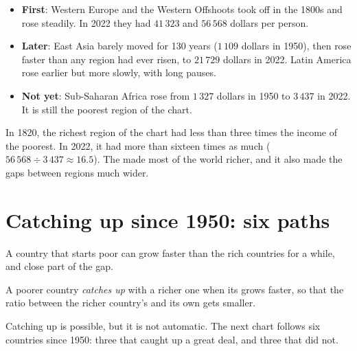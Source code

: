 \begin{itemize}
  \item \textbf{First}: Western Europe and the Western Offshoots took off in the
        1800s and rose steadily. In 2022 they had $41\,323$ and $56\,568$ dollars
        per person.
  \item \textbf{Later}: East Asia barely moved for 130 years ($1\,109$ dollars
        in 1950), then rose faster than any region had ever risen, to $21\,729$
        dollars in 2022. Latin America rose earlier but more slowly, with long
        pauses.
  \item \textbf{Not yet}: Sub-Saharan Africa rose from $1\,327$ dollars in 1950 to
        $3\,437$ in 2022. It is still the poorest region of the chart.
\end{itemize}

In 1820, the richest region of the chart had less than three times the income of
the poorest. In 2022, it had more than sixteen times as much ($56\,568 \div
3\,437 \approx 16.5$). The  made most of the world richer, and it also
made the gaps between regions much wider.

\section{Catching up since 1950: six paths}

A country that starts poor can grow faster than the rich countries for a
while, and close part of the gap.

\begin{definition}[Catch-up]\label{def:g6:living-standards:catch-up}
A poorer country \emph{catches up} with a richer one when its
 grows faster, so that the ratio between the richer country's
 and its own gets smaller.
\end{definition}

Catching up is possible, but it is not automatic. The next chart follows six
countries since 1950: three that caught up a great deal, and three that did not.

